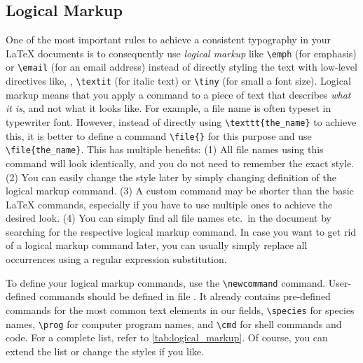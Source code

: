 \subsection{Logical Markup}
One of the most important rules to achieve a consistent typography in your \LaTeX{}
documents is to consequently use \emph{logical markup} like \verb!\emph! (for
emphasis) or \verb!\email! (for an email address) instead of directly styling
the text with low-level directives like, \eg, \verb!\textit! (for italic text)
or \verb!\tiny! (for small a font size). Logical markup means that you apply a
command to a piece of text that describes \emph{what it is}, and not what it
looks like. For example, a file name is often typeset in typewriter font.
However, instead of directly using \verb!\texttt{the_name}!  to achieve this,
it is better to define a command \verb!\file{}! for this purpose and use
\verb!\file{the_name}!. This has multiple benefits: (1) All file names using
this command will look identically, and you do not need to remember the exact
style. (2) You can easily change the style later by simply changing definition
of the logical markup command. (3) A custom command may be shorter than the
basic \LaTeX{} commands, especially if you have to use multiple ones to
achieve the desired look. (4) You can simply find all file names etc.\ in the
document by searching for the respective logical markup command. In case you
want to get rid of a logical markup command later, you can usually simply
replace all occurrences using a regular expression substitution.

To define your logical markup commands, use the \verb!\newcommand! command.
User-defined commands should be defined in file .
It already contains pre-defined commands for the most common text elements in
our fields, \eg \verb!\species! for species names, \verb!\prog! for computer
program names, and \verb!\cmd! for shell commands and code. For a complete
list, refer to \autoref{tab:logical_markup}. Of course, you can extend the
list or change the styles if you like.

